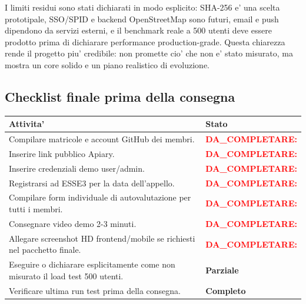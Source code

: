 \documentclass[11pt,a4paper]{article}
\newcommand{\todo}[1]{\textcolor{red}{\textbf{DA\_COMPLETARE: #1}}}
\newcommand{\ok}{\textcolor{revalueGreen}{\textbf{Completo}}}
\newcommand{\partiale}{\textcolor{revalueOrange}{\textbf{Parziale}}}
\begin{document}
I limiti residui sono stati dichiarati in modo esplicito: SHA-256 e' una scelta
prototipale, SSO/SPID e backend OpenStreetMap sono futuri, email e push dipendono
da servizi esterni, e il benchmark reale a 500 utenti deve essere prodotto prima
di dichiarare performance production-grade. Questa chiarezza rende il progetto
piu' credibile: non promette cio' che non e' stato misurato, ma mostra un core
solido e un piano realistico di evoluzione.

\subsection{Checklist finale prima della consegna}

\begin{longtable}{L{11cm} L{3cm}}
\toprule
\textbf{Attivita'} & \textbf{Stato} \\
\midrule
Compilare matricole e account GitHub dei membri. & \todo{} \\
Inserire link pubblico Apiary. & \todo{} \\
Inserire credenziali demo user/admin. & \todo{} \\
Registrarsi ad ESSE3 per la data dell'appello. & \todo{} \\
Compilare form individuale di autovalutazione per tutti i membri. & \todo{} \\
Consegnare video demo 2-3 minuti. & \todo{} \\
Allegare screenshot HD frontend/mobile se richiesti nel pacchetto finale. & \todo{} \\
Eseguire o dichiarare esplicitamente come non misurato il load test 500 utenti. & \partiale \\
Verificare ultima run test prima della consegna. & \ok \\
\bottomrule
\end{longtable}
\end{document}
